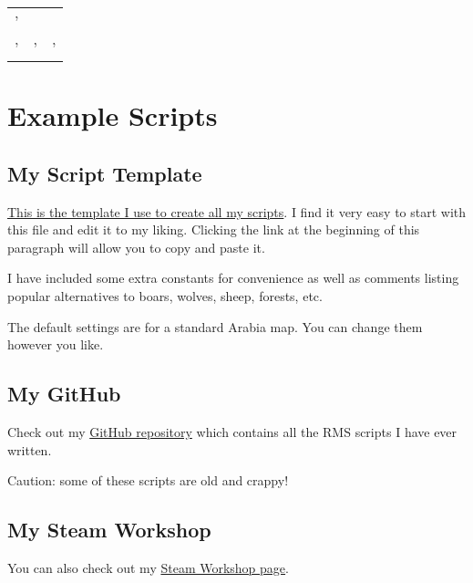 \documentclass[]{article}
\theoremstyle{plain}
\theoremstyle{remark}
\theoremstyle{definition}
\begin{document}
\begin{longtable}[]{@{}lll@{}}
\begin{minipage}[t]{0.11\columnwidth}
'\strut
\end{minipage}\tabularnewline
\begin{minipage}[t]{0.41\columnwidth}\raggedright
'\strut
\end{minipage} & \begin{minipage}[t]{0.28\columnwidth}\raggedright
'\strut
\end{minipage} & \begin{minipage}[t]{0.11\columnwidth}\raggedright
'\strut
\end{minipage}\tabularnewline
\bottomrule
\end{longtable}

\hypertarget{example-scripts}{%
\section{Example Scripts}\label{example-scripts}}

\hypertarget{my-script-template}{%
\subsection{My Script Template}\label{my-script-template}}

\href{https://raw.githubusercontent.com/HousedHorse/hh-rms-aoe2/master/template.rms}{This
is the template I use to create all my scripts}. I find it very easy to
start with this file and edit it to my liking. Clicking the link at the
beginning of this paragraph will allow you to copy and paste it.

I have included some extra constants for convenience as well as comments
listing popular alternatives to boars, wolves, sheep, forests, etc.

The default settings are for a standard Arabia map. You can change them
however you like.

\hypertarget{my-github}{%
\subsection{My GitHub}\label{my-github}}

Check out my \href{https://github.com/HousedHorse/hh-rms-aoe2}{GitHub
repository} which contains all the RMS scripts I have ever written.

Caution: some of these scripts are old and crappy!

\hypertarget{my-steam-workshop}{%
\subsection{My Steam Workshop}\label{my-steam-workshop}}

You can also check out my
\href{https://steamcommunity.com/id/housedhorse/myworkshopfiles/?appid=221380}{Steam
Workshop page}.
\end{document}
